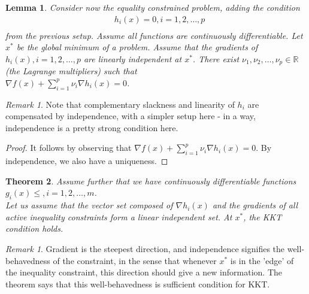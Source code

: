 \documentclass{article}
\newtheorem{theorem}{Theorem}
\newtheorem{lemma}[theorem]{Lemma}
\theoremstyle{remark}
\newtheorem{remark}[example]{Remark}
\begin{document}
\begin{lemma}
Consider now the equality constrained problem, adding the condition\\
\begin{align*}
        & h_i(x)=0,i=1,2,\dots,p\\
\end{align*}
from the previous setup. Assume all functions are continuously differentiable. 
Let $x^*$ be the global minimum of a problem. Assume that
 the gradients of $h_i(x),i=1,2,\dots,p$ are linearly independent at $x^*$. There
  exist $\nu_1,\nu_2,\dots,\nu_p\in\mathbb{R}$ (the Lagrange multipliers) such that\\
  $\nabla f(x)+\sum^p_{i=1}\nu_i\nabla h_i(x)=0$.
\end{lemma}
\begin{remark}
\item Note that complementary slackness and linearity of $h_i$ are compensated by independence, with a 
simpler setup here - in a way, independence is a pretty strong condition here.
\item 
\end{remark}
\begin{proof}
It follows by observing that $\nabla f(x)+\sum_{i=1}^p\nu_i\nabla h_i(x)=0.$ By independence,
 we also have a uniqueness.
\end{proof}
\begin{theorem}
Assume further that we have continuously differentiable functions $g_i(x)\leq,i=1,2,\dots,m$.\\
Let us assume that the vector set composed of $\nabla h_i(x)$ and the gradients of all active inequality constraints
 form a linear independent set. At $x^*$, the KKT condition holds.
\end{theorem}
\begin{remark}
\item Gradient is the steepest direction, and independence signifies the well-behavedness of
 the constraint, in the sense that whenever $x^*$ is in the 'edge' of the inequality constraint, this direction should give a new information. The
  theorem says that this well-behavedness is sufficient condition for KKT.
\end{remark}
\end{document}
